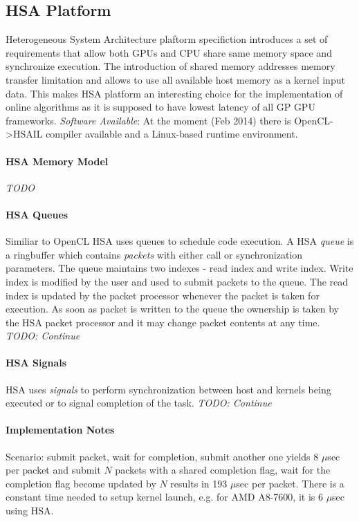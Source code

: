 \documentclass[]{report}
\begin{document}
\subsection*{HSA Platform}
Heterogeneous System Architecture plaftorm specifiction introduces a set of requirements that allow both GPUs and CPU share same memory space and synchronize execution\cite{HSAPlatform}. The introduction of shared memory addresses memory transfer limitation and allows to use all available host memory as a kernel input data. This makes HSA platform an interesting choice for the implementation of online algorithms as it is supposed to have lowest latency of all GP GPU frameworks.
\textit{Software Available}:
At the moment (Feb 2014) there is OpenCL->HSAIL compiler available\cite{CLOC} and a Linux-based runtime environment\cite{HSAGithub}. 

\paragraph*{HSA Memory Model}
\textit{TODO}
\paragraph*{HSA Queues}
Similiar to OpenCL\cite{OpenCL} HSA uses queues to schedule code execution. A HSA \textit{queue} is a ringbuffer which contains \textit{packets} with either call or synchronization parameters. The queue maintains two indexes - read index and write index. Write index is modified by the user and used to submit packets to the queue. The read index is updated by the packet processor whenever the packet is taken for execution. As soon as packet is written to the queue the ownership is taken by the HSA packet processor and it may change packet contents at any time\cite{HSAPlatform}.
\textit{TODO: Continue}
\paragraph*{HSA Signals}
HSA uses \textit{signals} to perform synchronization between host and kernels being executed or to signal completion of the task.
\textit{TODO: Continue}
\paragraph*{Implementation Notes}
Scenario: submit packet, wait for completion, submit another one yields 8 $\mu$sec per packet and submit $ N $ packets with a shared completion flag, wait for the completion flag become updated by $N$ results in 193 $\mu$sec per packet.
There is a constant time needed to setup kernel launch, e.g. for AMD A8-7600, it is 6 $\mu$sec using HSA. 
\end{document}

